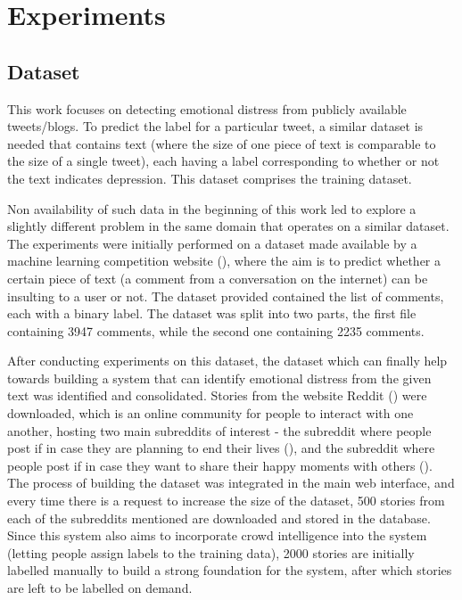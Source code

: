 \chapter{Experiments}
\label{chapter:Experiments}


\section{Dataset}
This work focuses on detecting emotional distress from publicly available tweets/blogs. To predict the label for a particular tweet, a similar dataset is needed that contains text (where the size of one piece of text is comparable to the size of a single tweet), each having a label corresponding to whether or not the text indicates depression. This dataset comprises the training dataset.

Non availability of such data in the beginning of this work led to explore a slightly different problem in the same domain that operates on a similar dataset. The experiments were initially performed on a dataset made available by a machine learning competition website (\cite{kaggle}), where the aim is to predict whether a certain piece of text (a comment from a conversation on the internet) can be insulting to a user or not. The dataset provided contained the list of comments, each with a binary label. The dataset was split into two parts, the first file containing 3947 comments, while the second one containing 2235 comments.

After conducting experiments on this dataset, the dataset which can finally help towards building a system that can identify emotional distress from the given text was identified and consolidated. Stories from the website Reddit (\cite{reddit}) were downloaded, which is an online community for people to interact with one another, hosting two main subreddits of interest - the subreddit where people post if in case they are planning to end their lives (\cite{reddit_suicidewatch}), and the subreddit where people post if in case they want to share their happy moments with others (\cite{reddit_happy}). The process of building the dataset was integrated in the main web interface, and every time there is a request to increase the size of the dataset, 500 stories from each of the subreddits mentioned are downloaded and stored in the database. Since this system also aims to incorporate crowd intelligence into the system (letting people assign labels to the training data), 2000 stories are initially labelled manually to build a strong foundation for the system, after which stories are left to be labelled on demand.

